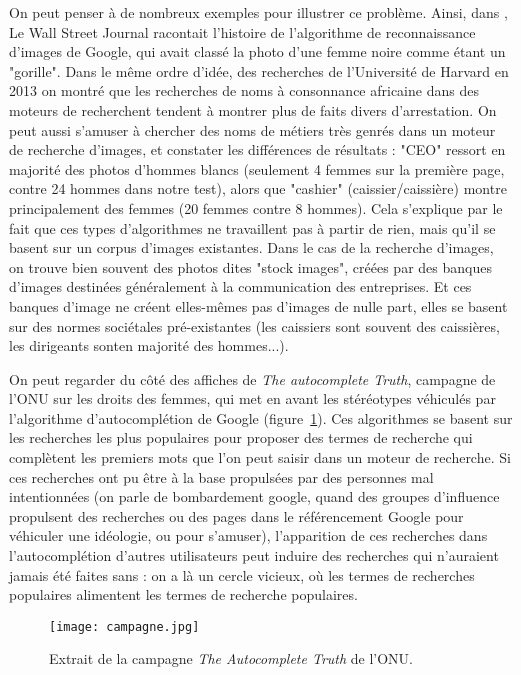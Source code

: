 \documentclass[a4paper,14pt]{extreport}
\begin{document}
On peut penser à de nombreux exemples pour illustrer ce problème. Ainsi, dans \cite{gorilla}, Le Wall Street Journal racontait l'histoire de l'algorithme de reconnaissance d'images de Google, qui avait classé la photo d'une femme noire comme étant un "gorille". Dans le même ordre d'idée, des recherches de l'Université de Harvard en 2013 on montré que les recherches de noms à consonnance africaine dans des moteurs de recherchent tendent à montrer plus de faits divers d'arrestation. On peut aussi s'amuser à chercher des noms de métiers très genrés dans un moteur de recherche d'images, et constater les différences de résultats : "CEO" ressort en majorité des photos d'hommes blancs (seulement 4 femmes sur la première page, contre 24 hommes dans notre test), alors que "cashier" (caissier/caissière) montre principalement des femmes (20 femmes contre 8 hommes). Cela s'explique par le fait que ces types d'algorithmes ne travaillent pas à partir de rien, mais qu'il se basent sur un corpus d'images existantes. Dans le cas de la recherche d'images, on trouve bien souvent des photos dites "stock images", créées par des banques d'images destinées généralement à la communication des entreprises. Et ces banques d'image ne créent elles-mêmes pas d'images de nulle part, elles se basent sur des normes sociétales pré-existantes (les caissiers sont souvent des caissières, les dirigeants sonten majorité des hommes...).

On peut regarder du côté des affiches de \textit{The autocomplete Truth}, campagne de l'ONU sur les droits des femmes, qui met en avant les stéréotypes véhiculés par l'algorithme d'autocomplétion de Google (figure~\ref{campagne}). Ces algorithmes se basent sur les recherches les plus populaires pour proposer des termes de recherche qui complètent les premiers mots que l'on peut saisir dans un moteur de recherche. Si ces recherches ont pu être à la base propulsées par des personnes mal intentionnées (on parle de bombardement google, quand des groupes d'influence propulsent des recherches ou des pages dans le référencement Google pour véhiculer une idéologie, ou pour s'amuser), l'apparition de ces recherches dans l'autocomplétion d'autres utilisateurs peut induire des recherches qui n'auraient jamais été faites sans : on a là un cercle vicieux, où les termes de recherches populaires alimentent les termes de recherche populaires.

\begin{figure}[ht]
 \begin{center}
  \texttt{[image: campagne.jpg]}
 \end{center}
 \caption{Extrait de la campagne \textit{The Autocomplete Truth} de l'ONU.}
 \label{campagne}
\end{figure}
\end{document}
